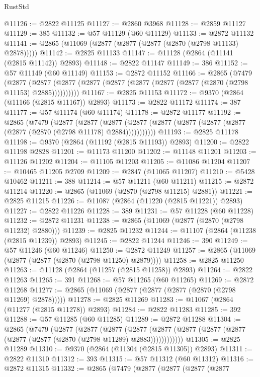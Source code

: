 \begin{lexlean}{RustStd}
\begin{coremodule}
@11126 := @2822 @11125
@11127 := @2860 @3968
@11128 := @2859 @11127
@11129 := 385
@11132 := @57 @11129 (@60 @11129)
@11133 := @2872 @11132
@11141 := @2865 (@11069 (@2877 (@2877 (@2877 (@2870 (@2798 @11133) @2878)))))
@11142 := @2825 @11133
@11147 := @11128 (@2864 (@11141 (@2815 @11142)) @2893)
@11148 := @2822 @11147
@11149 := 386
@11152 := @57 @11149 (@60 @11149)
@11153 := @2872 @11152
@11166 := @2865
    (@7479
      (@2877 (@2877 (@2877 (@2877 (@2877 (@2877 (@2877 (@2877 (@2870 (@2798 @11153) @2885))))))))))
@11167 := @2825 @11153
@11172 := @9370 (@2864 (@11166 (@2815 @11167)) @2893)
@11173 := @2822 @11172
@11174 := 387
@11177 := @57 @11174 (@60 @11174)
@11178 := @2872 @11177
@11192 := @2865
    (@7479
      (@2877
        (@2877
          (@2877 (@2877 (@2877 (@2877 (@2877 (@2877 (@2877 (@2870 (@2798 @11178) @2884)))))))))))
@11193 := @2825 @11178
@11198 := @9370 (@2864 (@11192 (@2815 @11193)) @2893)
@11200 := @2822 @11198 @2828
@11201 := @11173 @11200
@11202 := @11148 @11201
@11203 := @11126 @11202
@11204 := @11105 @11203
@11205 := @11086 @11204
@11207 := @10465 @11205 @2709
@11209 := @2847 (@11065 @11207)
@11210 := @5428 @10462
@11211 := 388
@11214 := @57 @11211 (@60 @11211)
@11215 := @2872 @11214
@11220 := @2865 (@11069 (@2870 (@2798 @11215) @2881))
@11221 := @2825 @11215
@11226 := @11087 (@2864 (@11220 (@2815 @11221)) @2893)
@11227 := @2822 @11226
@11228 := 389
@11231 := @57 @11228 (@60 @11228)
@11232 := @2872 @11231
@11238 := @2865 (@11069 (@2877 (@2870 (@2798 @11232) @2880)))
@11239 := @2825 @11232
@11244 := @11107 (@2864 (@11238 (@2815 @11239)) @2893)
@11245 := @2822 @11244
@11246 := 390
@11249 := @57 @11246 (@60 @11246)
@11250 := @2872 @11249
@11257 := @2865 (@11069 (@2877 (@2877 (@2870 (@2798 @11250) @2879))))
@11258 := @2825 @11250
@11263 := @11128 (@2864 (@11257 (@2815 @11258)) @2893)
@11264 := @2822 @11263
@11265 := 391
@11268 := @57 @11265 (@60 @11265)
@11269 := @2872 @11268
@11277 := @2865 (@11069 (@2877 (@2877 (@2877 (@2870 (@2798 @11269) @2878)))))
@11278 := @2825 @11269
@11283 := @11067 (@2864 (@11277 (@2815 @11278)) @2893)
@11284 := @2822 @11283
@11285 := 392
@11288 := @57 @11285 (@60 @11285)
@11289 := @2872 @11288
@11304 := @2865
    (@7479
      (@2877
        (@2877
          (@2877
            (@2877 (@2877 (@2877 (@2877 (@2877 (@2877 (@2877 (@2870 (@2798 @11289) @2883))))))))))))
@11305 := @2825 @11289
@11310 := @9370 (@2864 (@11304 (@2815 @11305)) @2893)
@11311 := @2822 @11310
@11312 := 393
@11315 := @57 @11312 (@60 @11312)
@11316 := @2872 @11315
@11332 := @2865
    (@7479
      (@2877
        (@2877
          (@2877
            (@2877

\end{coremodule}
\end{lexlean}
